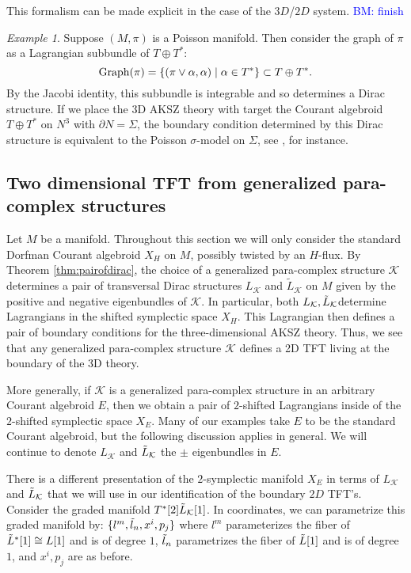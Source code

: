\documentclass{article}
\newcommand{\TT}{{T\oplus T^*}}
\newcommand{\KK}{\mathcal{K}}
\theoremstyle{definition}
\theoremstyle{remark}
\newtheorem{Ex}[theorem]{Example}
\def\brian{\textcolor{blue}{BM: }\textcolor{blue}}
\begin{document}
This formalism can be made explicit in the case of the $3D$/$2D$ system. \brian{finish}


\begin{Ex}
Suppose $(M, \pi)$ is a Poisson manifold. 
Then consider the graph of $\pi$ as a Lagrangian subbundle of $\TT$:
\[
{\rm Graph}(\pi) = \{(\pi \vee \alpha , \alpha) \; | \; \alpha \in T^* \} \subset \TT .
\]
By the Jacobi identity, this subbundle is integrable and so determines a Dirac structure. 
If we place the 3D AKSZ theory with target the Courant algebroid $\TT$ on $N^3$ with $\partial N = \Sigma$, the boundary condition determined by this Dirac structure is equivalent to the Poisson $\sigma$-model on $\Sigma$, see \cite{KSSdirac}, for instance.
\end{Ex}

\subsection{Two dimensional TFT from generalized para-complex structures}

Let $M$ be a manifold.
Throughout this section we will only consider the standard Dorfman Courant algebroid $X_H$ on $M$, possibly twisted by an $H$-flux.
By Theorem \ref{thm:pairofdirac}, the choice of a generalized para-complex structure $\KK$ determines a pair of transversal Dirac structures $L_{\KK}$ and $\tilde{L}_{\KK}$ on $M$ given by the positive and negative eigenbundles of $\KK$. 
In particular, both $L_{\KK}, \Tilde{L}_{\KK}$determine Lagrangians in the shifted symplectic space $X_{H}$. 
This Lagrangian then defines a pair of boundary conditions for the three-dimensional AKSZ theory.
Thus, we see that any generalized para-complex structure $\KK$ defines a 2D TFT living at the boundary of the 3D theory. 

More generally, if $\KK$ is a generalized para-complex structure in an arbitrary Courant algebroid $E$, then we obtain a pair of $2$-shifted Lagrangians inside of the $2$-shifted symplectic space $X_E$. 
Many of our examples take $E$ to be the standard Courant algebroid, but the following discussion applies in general. 
We will continue to denote $L_{\KK}$ and $\Tilde{L}_{\KK}$ the $\pm$ eigenbundles in $E$. 

There is a different presentation of the $2$-symplectic manifold $X_E$ in terms of $L_{\KK}$ and $\Tilde{L}_{\KK}$ that we will use in our identification of the boundary $2D$ TFT's. 
Consider the graded manifold $T^*[2] \Tilde{L}_{\KK} [1]$.
In coordinates, we can parametrize this graded manifold by: $\{l^m, \Tilde{l}_n, x^i, p_j\}$ where $l^m$ parameterizes the fiber of $\Tilde{L}^*[1] \cong L [1]$ and is of degree $1$, $\Tilde{l}_n$ parametrizes the fiber of $\Tilde{L}[1]$ and is of degree $1$, and $x^i, p_j$ are as before.
\end{document}
